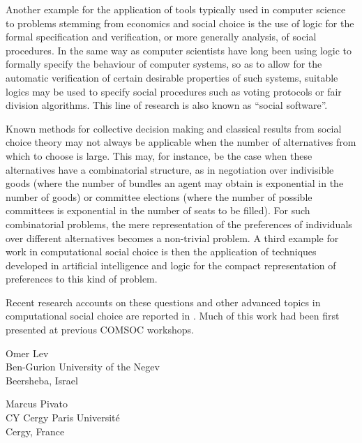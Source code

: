 \documentclass{comsoc2023}[a4paper]
\begin{document}
Another example for the application of tools typically used in computer science to problems stemming from economics and social choice is the use of logic for the formal specification and verification, or more generally analysis, of social procedures. In the same way as computer scientists have long been using logic to formally specify the behaviour of computer systems, so as to allow for the automatic verification of certain desirable properties of such systems, suitable logics may be used to specify social procedures such as voting protocols or fair division algorithms. This line of research is also known as ``social software''.

Known methods for collective decision making and classical results from social choice theory may not always be applicable when the number of alternatives from which to choose is large. This may, for instance, be the case when these alternatives have a combinatorial structure, as in negotiation over indivisible goods (where the number of bundles an agent may obtain is exponential in the number of goods) or committee elections (where the number of possible committees is exponential in the number of seats to be filled). For such combinatorial problems, the mere representation of the preferences of individuals over different alternatives becomes a non-trivial problem. A third example for work in computational social choice is then the application of techniques developed in artificial intelligence and logic for the compact representation of preferences to this kind of problem.

Recent research accounts on these questions and other advanced topics in computational social choice are reported in \citet{End17}. Much of this work had been first presented at previous COMSOC workshops.






\begin{contact}
Omer Lev\\
Ben-Gurion University of the Negev\\
Beersheba, Israel\\
\end{contact}

\begin{contact}
Marcus Pivato\\
CY Cergy Paris Université \\
Cergy, France\\
\end{contact}

\end{document}
